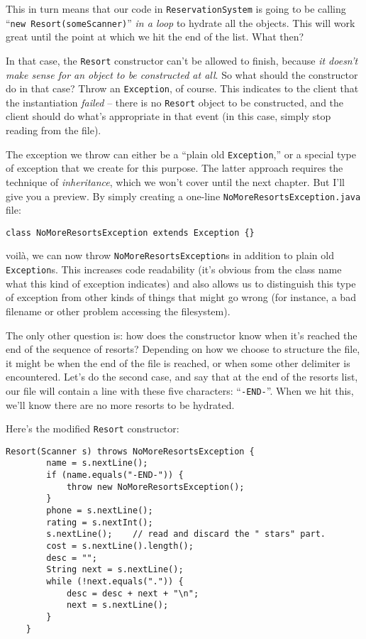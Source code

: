 This in turn means that our code in \texttt{ReservationSystem} is going to be
calling ``\texttt{new Resort(someScanner)}'' \textit{in a loop} to hydrate all
the objects. This will work great until the point at which we hit the end of
the list. What then?

In that case, the \texttt{Resort} constructor can't be allowed to finish,
because \textit{it doesn't make sense for an object to be constructed at all}.
So what should the constructor do in that case? Throw an \texttt{Exception},
of course. This indicates to the client that the instantiation \textit{failed}
-- there is no \texttt{Resort} object to be constructed, and the client should
do what's appropriate in that event (in this case, simply stop reading from
the file).

The exception we throw can either be a ``plain old \texttt{Exception},'' or a
special type of exception that we create for this purpose. The latter approach
requires the technique of \textit{inheritance}, which we won't cover until the
next chapter. But I'll give you a preview. By simply creating a one-line
\texttt{NoMoreResortsException.java} file:

\begin{Verbatim}[fontsize=\small,samepage=true,frame=single]
class NoMoreResortsException extends Exception {}
\end{Verbatim}

voil\`{a}, we can now throw \texttt{NoMoreResortsException}s in addition to
plain old \texttt{Exception}s. This increases code readability (it's obvious
from the class name what this kind of exception indicates) and also allows us
to distinguish this type of exception from other kinds of things that might go
wrong (for instance, a bad filename or other problem accessing the
filesystem).

The only other question is: how does the constructor know when it's reached
the end of the sequence of resorts? Depending on how we choose to structure
the file, it might be when the end of the file is reached, or when some other
delimiter is encountered. Let's do the second case, and say that at the end of
the resorts list, our file will contain a line with these five characters:
``\texttt{-END-}''. When we hit this, we'll know there are no more resorts to be
hydrated.

Here's the modified \texttt{Resort} constructor:

\begin{Verbatim}[fontsize=\footnotesize,samepage=true,frame=single]
    Resort(Scanner s) throws NoMoreResortsException {
        name = s.nextLine();
        if (name.equals("-END-")) {
            throw new NoMoreResortsException();
        }
        phone = s.nextLine();
        rating = s.nextInt();
        s.nextLine();    // read and discard the " stars" part.
        cost = s.nextLine().length();
        desc = "";
        String next = s.nextLine();
        while (!next.equals(".")) {
            desc = desc + next + "\n";
            next = s.nextLine();
        }
    }
\end{Verbatim}

